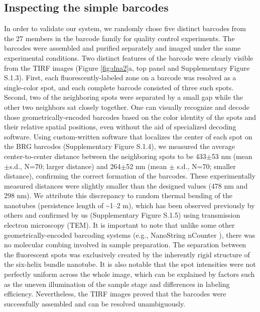 \subsection{Inspecting the simple barcodes}
In order to validate our system, we randomly chose five distinct barcodes from the
27 members in the barcode family for quality control experiments. The barcodes were 
assembled and purified separately and imaged under the same experimental conditions. 
Two distinct features of the barcode were clearly visible from the TIRF images (Figure 
\ref{fig:dna2}a, top panel and Supplementary Figure S.1.3). First, each fluorescently-labeled zone on a barcode was 
resolved as a single-color spot, and each complete barcode consisted of three such 
spots. Second, two of the neighboring spots were separated by a small gap while the other 
two neighbors sat closely together. One can visually recognize and decode 
those geometrically-encoded barcodes based on the color identity of the spots and their 
relative spatial positions, even without the aid of specialized decoding software. 
Using custom-written software that localizes the center of each spot on the BRG 
barcodes (Supplementary Figure 
S.1.4), we measured the average center-to-center distance between the 
neighboring spots to be 433$\pm$53 nm (mean$\pm$s.d., N=70; larger distance) and 264$\pm$52 nm 
(mean $\pm$ s.d., N=70; smaller distance), confirming the correct formation of the barcodes. 
These experimentally measured distances were slightly smaller than the designed values 
(478 nm and 298 nm). We attribute this discrepancy to random thermal bending of the 
nanotubes (persistence length of \textasciitilde1–2 \textmu m), which has been observed previously by 
others \citep{rothemund_folding_2006, han_folding_2010} and confirmed by us (Supplementary Figure S.1.5) using transmission electron microscopy 
(TEM). It is important to note that unlike some other geometrically-encoded barcoding 
systems (e.g., NanoString nCounter \citep{geiss_direct_2008}), there was no molecular combing involved in
sample preparation. The separation between the fluorescent spots was exclusively 
created by the inherently rigid structure of the six-helix bundle nanotube. It is also 
notable that the spot intensities were not perfectly uniform across the whole image, which 
can be explained by factors such as the uneven illumination of the sample stage and 
differences in labeling efficiency. Nevertheless, the TIRF images proved that the 
barcodes were successfully assembled and can be resolved unambiguously.

